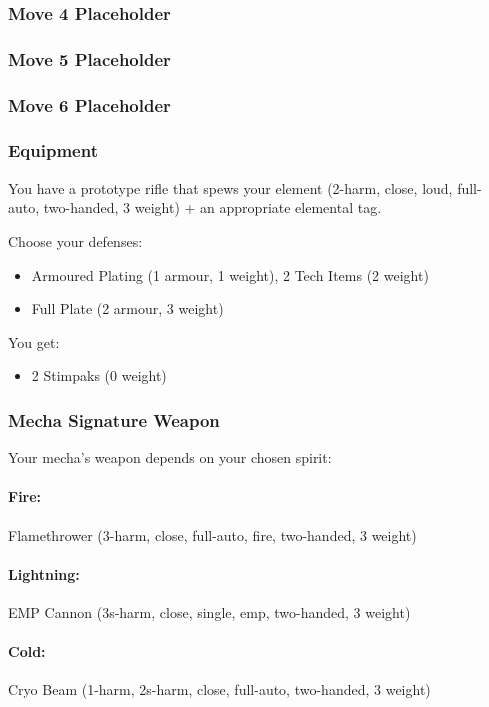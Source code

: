 \subsubsection {Move 4 Placeholder} %

\subsubsection {Move 5 Placeholder} %

\subsubsection {Move 6 Placeholder} %

\subsubsection{Equipment}
You have a prototype rifle that spews your element (2-harm, close, loud, full-auto, two-handed, 3 weight) + an appropriate elemental tag.

Choose your defenses:
\begin{itemize}
\item Armoured Plating (1 armour, 1 weight), 2 Tech Items (2 weight)
\item Full Plate (2 armour, 3 weight)
\end{itemize}

You get:
\begin{itemize}
\item 2 Stimpaks (0 weight)
\end{itemize}

\subsubsection{Mecha Signature Weapon}
Your mecha's weapon depends on your chosen spirit:
\paragraph{Fire:} Flamethrower (3-harm, close, full-auto, fire, two-handed, 3 weight)
\paragraph{Lightning:} EMP Cannon (3s-harm, close, single, emp, two-handed, 3 weight)
\paragraph{Cold:} Cryo Beam (1-harm, 2s-harm, close, full-auto, two-handed, 3 weight)
